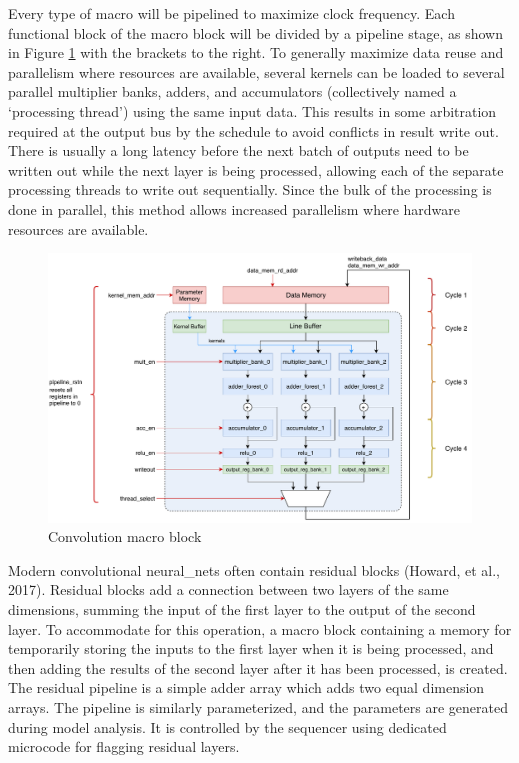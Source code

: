 \documentclass{uw-ece-wkrpt}
\begin{document}
Every type of macro will be pipelined to maximize clock frequency. Each functional block of the macro block will be divided by a pipeline stage, as shown in Figure \ref{fig:convolution_macro} with the brackets to the right. To generally maximize data reuse and parallelism where resources are available, several \glspl{kernel} can be loaded to several parallel multiplier banks, adders, and accumulators (collectively named a `processing thread') using the same input data. This results in some arbitration required at the output bus by the schedule to avoid conflicts in result write out. There is usually a long latency before the next batch of outputs need to be written out while the next layer is being processed, allowing each of the separate processing threads to write out sequentially. Since the bulk of the processing is done in parallel, this method allows increased parallelism where hardware resources are available.

\begin{figure}
\centering
\includegraphics[width=\textwidth]{figures/convolution_macro}
\caption{Convolution macro block \cite{Ma2017An-automatic-RT}}\label{fig:convolution_macro}
\end{figure}

Modern convolutional \glspl{neural_net} often contain residual blocks (Howard, et al., 2017). Residual blocks add a connection between two layers of the same dimensions, summing the input of the first layer to the output of the second layer. To accommodate for this operation, a macro block containing a memory for temporarily storing the inputs to the first layer when it is being processed, and then adding the results of the second layer after it has been processed, is created. The residual pipeline is a simple adder array which adds two equal dimension arrays. The pipeline is similarly parameterized, and the parameters are generated during model analysis. It is controlled by the sequencer using dedicated microcode for flagging residual layers.
\end{document}
